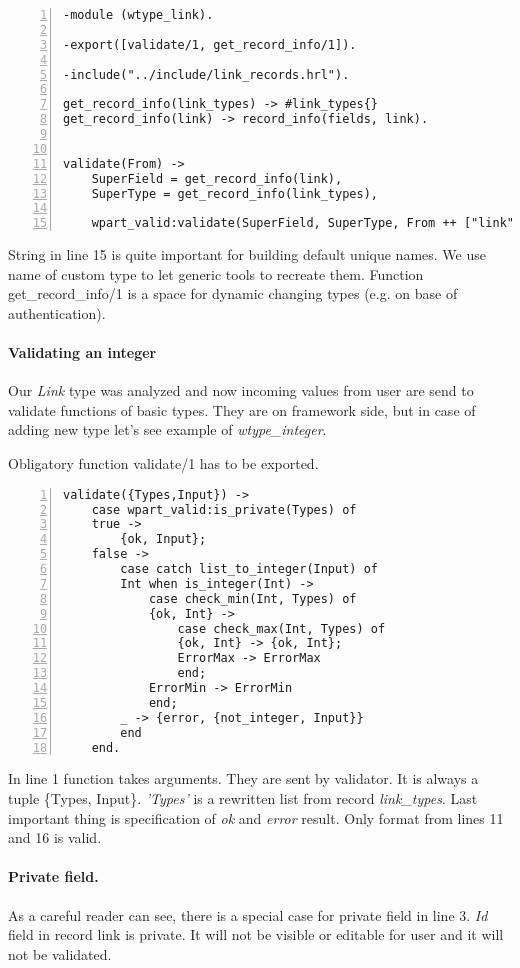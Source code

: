 \begin{Verbatim}[numbers=left, fontsize=\small]
-module (wtype_link).

-export([validate/1, get_record_info/1]).

-include("../include/link_records.hrl").

get_record_info(link_types) -> #link_types{}
get_record_info(link) -> record_info(fields, link).


validate(From) -> 
    SuperField = get_record_info(link),
    SuperType = get_record_info(link_types),

    wpart_valid:validate(SuperField, SuperType, From ++ ["link"]).
\end{Verbatim}

String in line 15 is quite important for building default unique names. We use name
of custom type to let generic tools to recreate them. Function
get\_record\_info/1 is a space for dynamic changing types (e.g. on base of authentication). 

\paragraph{Validating an integer}
Our \textit{Link} type was analyzed and now incoming values from user are send
to validate functions of basic types. They are on framework side, but in case of adding new
type let's see example of {\it wtype\_integer}.

Obligatory function validate/1 has to be exported.
\nopagebreak
\begin{Verbatim}[numbers=left, fontsize=\small]
validate({Types,Input}) ->
    case wpart_valid:is_private(Types) of
	true ->
	    {ok, Input};
	false ->
	    case catch list_to_integer(Input) of 
		Int when is_integer(Int) -> 
		    case check_min(Int, Types) of
			{ok, Int} ->
			    case check_max(Int, Types) of
				{ok, Int} -> {ok, Int};
				ErrorMax -> ErrorMax
			    end;
			ErrorMin -> ErrorMin
		    end;
		_ -> {error, {not_integer, Input}}
	    end
    end.
\end{Verbatim}
In line 1 function takes arguments. They are sent by validator. It is always
a tuple \{Types, Input\}. {\it 'Types'} is a rewritten list from record
{\it link\_types}. Last important thing is specification of \textit{ok} and
\textit{error} result. Only format from lines 11 and 16 is valid.
\paragraph{Private field.} As a careful reader can see, there is a special case 
for private field in line 3. {\it Id} field in record link is private. It will not be visible
or editable for user and it will not be validated. 

